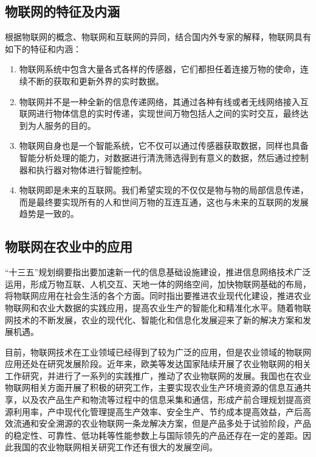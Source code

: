 	\subsection{物联网的特征及内涵}
根据物联网的概念、物联网和互联网的异同，结合国内外专家的解释，物联网具有如下的特征和内涵：
	\begin{enumerate}
  		\item 物联网系统中包含大量各式各样的传感器，它们都担任着连接万物的使命，连续不断的获取和更新外界的实时数据。
  		\item 物联网并不是一种全新的信息传递网络，其通过各种有线或者无线网络接入互联网进行物体信息的实时传递，实现世间万物包括人之间的实时交互，最终达到为人服务的目的。
  		\item 物联网自身也是一个智能系统，它不仅可以通过传感器获取数据，同样也具备智能分析处理的能力，对数据进行清洗筛选得到有意义的数据，然后通过控制器和执行器对物体进行智能控制。
  		\item 物联网即是未来的互联网。我们希望实现的不仅仅是物与物的局部信息传递，而是最终要实现所有的人和世间万物的互连互通，这也与未来的互联网的发展趋势是一致的。
	\end{enumerate}
	
	\subsection{物联网在农业中的应用}
“十三五”规划纲要指出要加速新一代的信息基础设施建设，推进信息网络技术广泛运用，形成万物互联、人机交互、天地一体的网络空间，加快物联网基础的布局，将物联网应用在社会生活的各个方面。同时指出要推进农业现代化建设，推进农业物联网和农业大数据的实践应用，提高农业生产的智能化和精准化水平。随着物联网技术的不断发展，农业的现代化、智能化和信息化发展迎来了新的解决方案和发展机遇。
	
目前，物联网技术在工业领域已经得到了较为广泛的应用，但是农业领域的物联网应用还处在研究发展阶段。近年来，欧美等发达国家陆续开展了农业物联网的相关工作研究，并进行了一系列的实践推广，推动了农业物联网的发展。我国也在农业物联网相关方面开展了积极的研究工作，主要实现农业生产环境资源的信息互通共享，以及农产品生产和物流等过程中的信息采集和通信，形成产前合理规划提高资源利用率，产中现代化管理提高生产效率、安全生产、节约成本提高效益，产后高效流通和安全溯源的农业物联网一条龙解决方案，但是产品多处于试验阶段，产品的稳定性、可靠性、低功耗等性能参数上与国际领先的产品还存在一定的差距。因此我国的农业物联网相关研究工作还有很大的发展空间。
	

